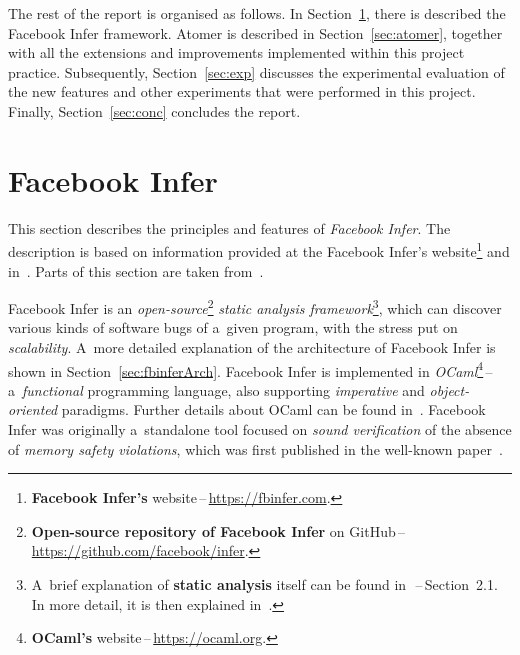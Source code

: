The rest of the report is organised as follows. In Section~\ref{sec:fbinfer},
there is described the Facebook Infer framework. Atomer is described in
Section~\ref{sec:atomer}, together with all the extensions and improvements
implemented within this project practice. Subsequently,
Section~\ref{sec:exp} discusses the experimental evaluation of the new
features and other experiments that were performed in this project.
Finally, Section~\ref{sec:conc} concludes the report.


\section{Facebook Infer}
\label{sec:fbinfer}

This section describes the principles and features of \emph{Facebook Infer}.
The description is based on information provided at the Facebook Infer's
website\footnote{\textbf{Facebook Infer's}
website\,--\,\url{https://fbinfer.com}.} and
in~\cite{projectPracticeMarcin2018}. Parts of this section are taken
from~\cite{harmimBP, excel2019FBInfer}.

Facebook Infer is an \emph{open-source}\footnote{\textbf{Open-source repository
of Facebook Infer} on GitHub\,--\,\url{https://github.com/facebook/infer}.}
\emph{static analysis framework}\footnote{A~brief explanation of \textbf{static
analysis} itself can be found in~\cite{harmimBP}\,--\,Section~2.1. In more
detail, it is then explained in~\cite{staticAnalysisMoller,
favStaticAnalysis}.}, which can discover various kinds of software bugs of
a~given program, with the stress put on \emph{scalability}. A~more detailed
explanation of the architecture of Facebook Infer is shown in
Section~\ref{sec:fbinferArch}. Facebook Infer is implemented in
\emph{OCaml}\footnote{\textbf{OCaml's}
website\,--\,\url{https://ocaml.org}.}\,--\,a~\emph{functional} programming
language, also supporting \emph{imperative} and \emph{object-oriented}
paradigms. Further details about OCaml can be found in~\cite{realWorldOCaml}.
Facebook Infer was originally a~standalone tool focused on \emph{sound
verification} of the absence of \emph{memory safety violations}, which was
first published in the well-known paper~\cite{inferBiabduction}.

